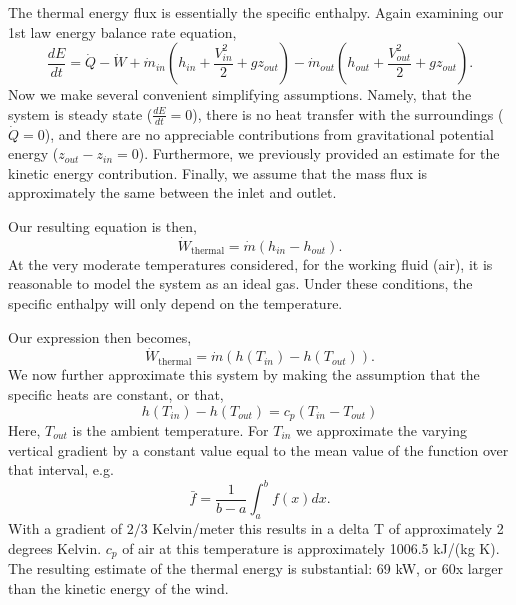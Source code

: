 \documentclass{article}
\begin{document}
The thermal energy flux is essentially the specific enthalpy. Again 
examining our 1st law energy balance rate equation, 
\begin{equation*}
\frac{dE}{dt} = \dot Q - \dot W + \dot m_{in}\left( h_{in} + \frac{V_{in}^2}{2} + gz_{out} \right)
- \dot m_{out}\left( h_{out} + \frac{V_{out}^2}{2} + gz_{out} \right).
\end{equation*}
Now we make several convenient simplifying assumptions. 
Namely, that the system is steady state ($\frac{dE}{dt} = 0$), 
there is no heat transfer with the surroundings ($\dot Q = 0$), 
and there are no appreciable contributions from gravitational 
potential energy ($z_{out}-z_{in} = 0$). Furthermore, we 
previously provided an estimate for the kinetic energy contribution. 
Finally, we assume that the mass flux is approximately the same 
between the inlet and outlet. 

Our resulting equation is then, 
\begin{equation*}
  \dot W_{\text{thermal}} = \dot m \left(h_{in}-h_{out}\right).
\end{equation*}
At the very moderate temperatures considered, 
for the working fluid (air), it is reasonable to model 
the system as an ideal gas. Under these conditions, 
the specific enthalpy will only depend on the temperature. 

Our expression then becomes, 
\begin{equation*}
  \dot W_{\text{thermal}} = \dot m \left(h(T_{in})-h(T_{out})\right).
\end{equation*}
We now further approximate this system by making the 
assumption that the specific heats are constant, or that, 
\begin{equation*}
  h(T_{in})-h(T_{out}) = c_p(T_{in}-T_{out})
\end{equation*}
Here, $T_{out}$ is the ambient temperature. For $T_{in}$ we 
approximate the varying vertical gradient by a constant value equal to the
mean value of the function over that interval, e.g.
\begin{equation*}
\bar f = \frac{1}{b-a} \int^b_a f(x) dx. 
\end{equation*}
With a gradient of $2/3$ Kelvin/meter this results in a delta T of approximately 2 degrees Kelvin. 
$c_p$ of air at this temperature is approximately 1006.5 kJ/(kg K). 
The resulting estimate of the thermal energy is substantial: 69 kW, or 60x larger than 
the kinetic energy of the wind.
\end{document}
